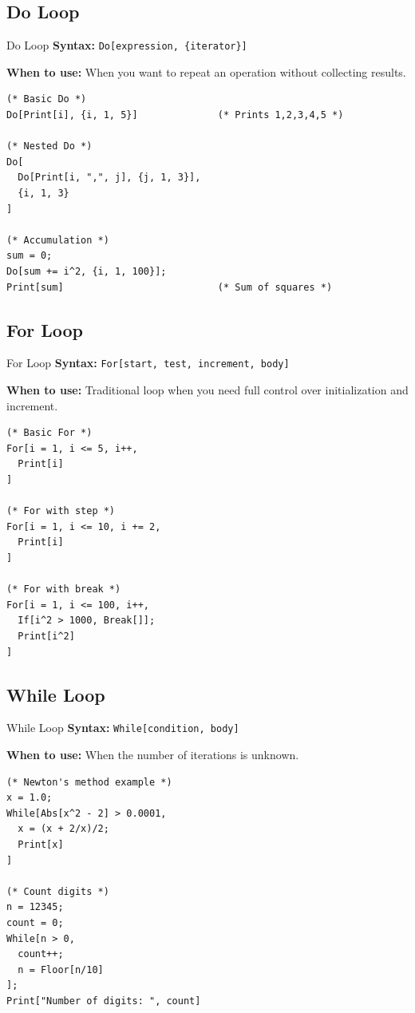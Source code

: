 \documentclass[12pt,a4paper]{article}
\begin{document}
\subsection{Do Loop}

\begin{mainbox}{Do Loop}
\textbf{Syntax:} \texttt{Do[expression, \{iterator\}]}

\textbf{When to use:} When you want to repeat an operation without collecting results.

\begin{lstlisting}
(* Basic Do *)
Do[Print[i], {i, 1, 5}]              (* Prints 1,2,3,4,5 *)

(* Nested Do *)
Do[
  Do[Print[i, ",", j], {j, 1, 3}],
  {i, 1, 3}
]

(* Accumulation *)
sum = 0;
Do[sum += i^2, {i, 1, 100}];
Print[sum]                           (* Sum of squares *)
\end{lstlisting}
\end{mainbox}

\subsection{For Loop}

\begin{mainbox}{For Loop}
\textbf{Syntax:} \texttt{For[start, test, increment, body]}

\textbf{When to use:} Traditional loop when you need full control over initialization and increment.

\begin{lstlisting}
(* Basic For *)
For[i = 1, i <= 5, i++,
  Print[i]
]

(* For with step *)
For[i = 1, i <= 10, i += 2,
  Print[i]
]

(* For with break *)
For[i = 1, i <= 100, i++,
  If[i^2 > 1000, Break[]];
  Print[i^2]
]
\end{lstlisting}
\end{mainbox}

\subsection{While Loop}

\begin{mainbox}{While Loop}
\textbf{Syntax:} \texttt{While[condition, body]}

\textbf{When to use:} When the number of iterations is unknown.

\begin{lstlisting}
(* Newton's method example *)
x = 1.0;
While[Abs[x^2 - 2] > 0.0001,
  x = (x + 2/x)/2;
  Print[x]
]

(* Count digits *)
n = 12345;
count = 0;
While[n > 0,
  count++;
  n = Floor[n/10]
];
Print["Number of digits: ", count]
\end{lstlisting}
\end{mainbox}
\end{document}
